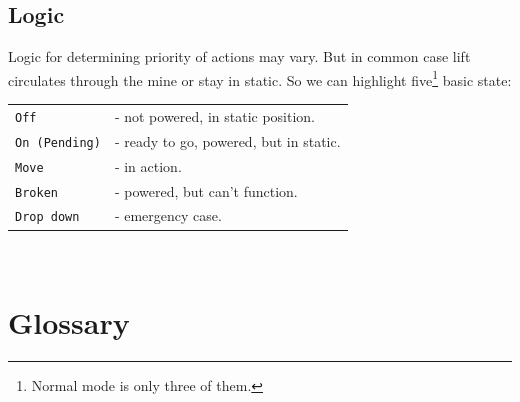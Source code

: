 \documentclass[a4paper,11pt]{article}
\begin{document}
\subsection{Logic}
\label{sub:Logic}
Logic for determining priority of actions may vary. But in common case lift circulates through the mine or stay in static. So we can highlight five\footnote{%
Normal mode is only three of them.}
basic state: \\

\begin{tabular}{ll}
  \hline
  \texttt{Off} & - not powered, in static position.\\
  \texttt{On (Pending)} & - ready to go, powered, but in static.\\
  \texttt{Move} & - in action.\\
  \texttt{Broken} & - powered, but can't function.\\
  \texttt{Drop down} & - emergency case.\\
  \hline
\end{tabular}\\

\section{Glossary}
\label{sec:Glossary}
\end{document}

